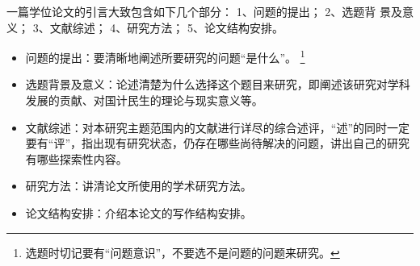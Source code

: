 一篇学位论文的引言大致包含如下几个部分：
1、问题的提出；
2、选题背 景及意义；
3、文献综述；
4、研究方法；
5、论文结构安排。
\begin{itemize}
  \item 问题的提出：要清晰地阐述所要研究的问题“是什么”。
    \footnote{选题时切记要有“问题意识”，不要选不是问题的问题来研究。}
  \item 选题背景及意义：论述清楚为什么选择这个题目来研究，即阐述该研究对学科发展的贡献、对国计民生的理论与现实意义等。
  \item 文献综述：对本研究主题范围内的文献进行详尽的综合述评，“述”的同时一定要有“评”，指出现有研究状态，仍存在哪些尚待解决的问题，讲出自己的研究有哪些探索性内容。
  \item 研究方法：讲清论文所使用的学术研究方法。
  \item 论文结构安排：介绍本论文的写作结构安排。
\end{itemize}

